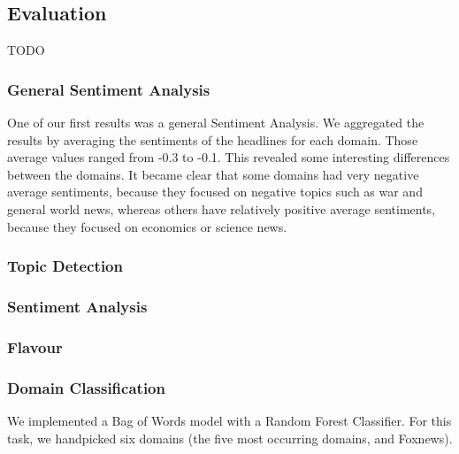 \documentclass[final]{ieee}
\begin{document}
\subsection{Evaluation}
TODO
\subsubsection{General Sentiment Analysis}
One of our first results was a general Sentiment Analysis. %
We aggregated the results by averaging the sentiments of the headlines for each domain. Those average values ranged from -0.3 to -0.1. %
This revealed some interesting differences between the domains. It became clear that some domains had very negative average sentiments, because they focused on negative topics such as war and general world news, whereas others have relatively positive average sentiments, because they focused on economics or science news. %

\subsubsection{Topic Detection}

\subsubsection{Sentiment Analysis}

\subsubsection{Flavour}

\subsubsection{Domain Classification}
We implemented a Bag of Words model with a Random Forest Classifier. For this task, we handpicked six domains (the five most occurring domains, and Foxnews). %


\end{document}
